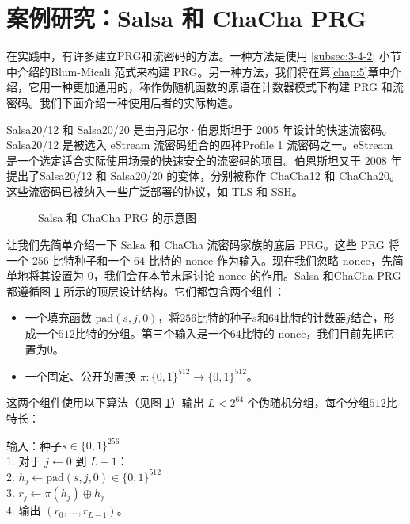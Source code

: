 \section{案例研究：Salsa 和 ChaCha PRG}\label{sec:3-6}

在实践中，有许多建立PRG和流密码的方法。一种方法是使用 \ref{subsec:3-4-2} 小节中介绍的Blum-Micali 范式来构建 PRG。另一种方法，我们将在第\ref{chap:5}章中介绍，它用一种更加通用的，称作伪随机函数的原语在计数器模式下构建 PRG 和流密码。我们下面介绍一种使用后者的实际构造。

Salsa20/12 和 Salsa20/20 是由丹尼尔·伯恩斯坦于 2005 年设计的快速流密码。Salsa20/12 是被选入 eStream 流密码组合的四种Profile 1 流密码之一。eStream 是一个选定适合实际使用场景的快速安全的流密码的项目。伯恩斯坦又于 2008 年提出了Salsa20/12 和 Salsa20/20 的变体，分别被称作 ChaCha12 和 ChaCha20。这些流密码已被纳入一些广泛部署的协议，如 TLS 和 SSH。

\begin{figure}
	\centering
	
	\caption{Salsa 和 ChaCha PRG 的示意图}
	\label{fig:3-8}
\end{figure}

让我们先简单介绍一下 Salsa 和 ChaCha 流密码家族的底层 PRG。这些 PRG 将一个 $256$ 比特种子和一个 $64$ 比特的 nonce 作为输入。现在我们忽略 nonce，先简单地将其设置为 $0$，我们会在本节末尾讨论 nonce 的作用。Salsa 和ChaCha PRG 都遵循图 \ref{fig:3-8} 所示的顶层设计结构。它们都包含两个组件：
\begin{itemize}
	\item 一个填充函数 $\mathrm{pad}(s,j,0)$，将$256$比特的种子$s$和$64$比特的计数器$j$结合，形成一个$512$比特的分组。第三个输入是一个$64$比特的 nonce，我们目前先把它置为$0$。
	\item 一个固定、公开的置换 $\pi:\{0,1\}^{512}\to\{0,1\}^{512}$。
\end{itemize}
这两个组件使用以下算法（见图 \ref{fig:3-8}）输出 $L<2^{64}$ 个伪随机分组，每个分组$512$比特长：

\vspace*{5pt}

\hspace*{5pt} 输入：种子$s\in\{0,1\}^{256}$\\
\hspace*{26pt} 1. 对于 $j\leftarrow0$ 到 $L-1$：\\
\hspace*{26pt} 2. \quad\quad\quad$h_j\leftarrow\mathrm{pad}(s,j,0)\in\{0,1\}^{512}$\\
\hspace*{26pt} 3. \quad\quad\quad$r_j\leftarrow\pi(h_j)\oplus h_j$\\
\hspace*{26pt} 4. 输出 $(r_0,\dots,r_{L-1})$。

